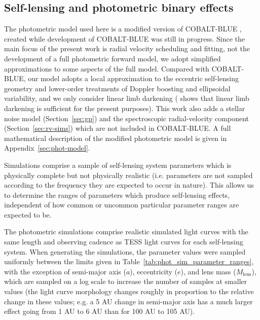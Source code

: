 \documentclass[fleqn,usenatbib]{mnras}
\begin{document}
\subsection{Self-lensing and photometric binary effects} \label{sec:phot-sims}

The photometric model used here is a modified version of COBALT-BLUE \citep{dixon_cobalt-blue_2026}, created while development of COBALT-BLUE was still in progress. Since the main focus of the present work is radial velocity scheduling and fitting, not the development of a full photometric forward model, we adopt simplified approximations to some aspects of the full model. Compared with COBALT-BLUE, our model adopts a local approximation to the eccentric self-lensing geometry and lower-order treatments of Doppler boosting and ellipsoidal variability, and we only consider linear limb darkening (\cite{dixon_cobalt-blue_2026} shows that linear limb darkening is sufficient for the present purposes). This work also adds a stellar noise model (Section~\ref{sec:gp}) and the spectroscopic radial-velocity component (Section~\ref{sec:rv-sims}) which are not included in COBALT-BLUE. A full mathematical description of the modified photometric model is given in Appendix~\ref{sec:phot-model}.

Simulations comprise a sample of self-lensing system parameters which is physically complete but not physically realistic (i.e. parameters are not sampled according to the frequency they are expected to occur in nature). This allows us to determine the ranges of parameters which produce self-lensing effects, independent of how common or uncommon particular parameter ranges are expected to be.

The photometric simulations comprise realistic simulated light curves with the same length and observing cadence as TESS light curves for each self-lensing system. When generating the simulations, the parameter values were sampled uniformly between the limits given in Table~\ref{tab:phot_sim_parameter_ranges}, with the exception of semi-major axis ($a$), eccentricity ($e$), and lens mass ($M_\mathrm{lens}$), which are sampled on a log scale to increase the number of samples at smaller values (the light curve morphology changes roughly in proportion to the relative change in these values; e.g. a 5 AU change in semi-major axis has a much larger effect going from 1 AU to 6 AU than for 100 AU to 105 AU).
\end{document}
